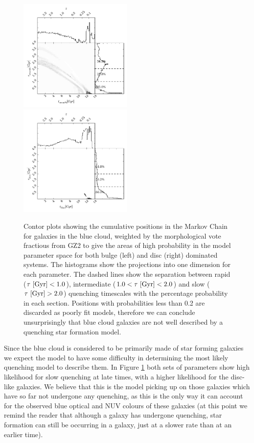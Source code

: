 \documentclass[useAMS,usenatbib]{mn2e}
\def\changed    {\color{titlecol} }
\begin{document}
\begin{figure}
\includegraphics[width=0.4975\textwidth]{blue_smooth.pdf}
\includegraphics[width=0.4975\textwidth]{blue_disc.pdf}
\caption[8pt]{{\changed Contor plots showing the cumulative positions in the Markov Chain for galaxies in the blue cloud, weighted by the morphological vote fractious from GZ2 to give the areas of high probability in the model parameter space for both bulge (left) and disc (right) dominated systems. The histograms show the projections into one dimension for each parameter. The dashed lines show the separation between rapid ($\tau ~\rm{[Gyr]} < 1.0$), intermediate ($1.0 < \tau ~\rm{[Gyr]} < 2.0$) and slow ($\tau ~\rm{[Gyr]} > 2.0$) quenching timescales with the percentage probability in each section. Positions with probabilities less than 0.2 are discarded as poorly fit models, therefore we can conclude unsurprisingly that blue cloud galaxies are not well described by a quenching star formation model. }}
\label{blue_c}
\end{figure}

Since the blue cloud is considered to be primarily made of star forming galaxies we expect the model to have some difficulty in determining the most likely quenching model to describe them. In Figure \ref{blue_c} both sets of parameters show high likelihood for slow quenching at late times, with a higher likelihood for the disc-like galaxies. We believe that this is the model picking up on those galaxies which have so far not undergone any quenching, as this is the only way it can account for the observed blue optical and NUV colours of these galaxies (at this point we remind the reader that although a galaxy has undergone quenching, star formation can still be occurring in a galaxy, just at a slower rate than at an earlier time). 
\end{document}
